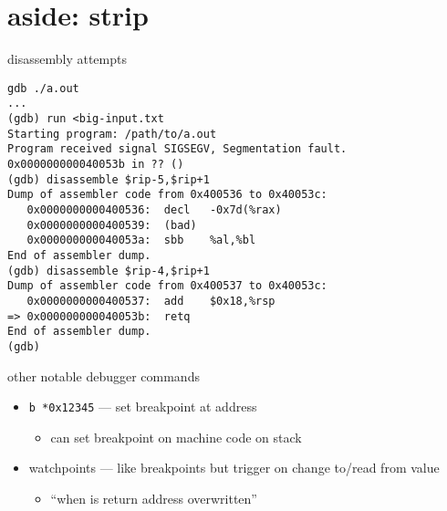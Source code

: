 \section{aside: strip}
\begin{frame}[fragile,label=badDisass]{disassembly attempts}
\begin{Verbatim}[fontsize=\fontsize{10}{11}\selectfont]
gdb ./a.out
...
(gdb) run <big-input.txt
Starting program: /path/to/a.out 
Program received signal SIGSEGV, Segmentation fault.
0x000000000040053b in ?? ()
(gdb) disassemble $rip-5,$rip+1
Dump of assembler code from 0x400536 to 0x40053c:
   0x0000000000400536:  decl   -0x7d(%rax)
   0x0000000000400539:  (bad)  
   0x000000000040053a:  sbb    %al,%bl
End of assembler dump.
(gdb) disassemble $rip-4,$rip+1
Dump of assembler code from 0x400537 to 0x40053c:
   0x0000000000400537:  add    $0x18,%rsp
=> 0x000000000040053b:  retq   
End of assembler dump.
(gdb)
\end{Verbatim}
\end{frame}

\begin{frame}[fragile,label=otherAss]{other notable debugger commands}
\begin{itemize}
\item \texttt{b *0x12345} --- set breakpoint at address
    \begin{itemize}
    \item can set breakpoint on machine code on stack
    \end{itemize}
\item watchpoints --- like breakpoints but trigger on change to/read from value
    \begin{itemize}
    \item ``when is return address overwritten''
    \end{itemize}
\end{itemize}
\end{frame}


